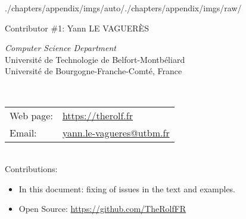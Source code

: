 \begin{graphicspathcontext}{{./chapters/appendix/imgs/auto/}{./chapters/appendix/imgs/raw/}}
\begin{frame}{{Contributor \#1:} Yann LE VAGUER\`ES}
	\begin{minipage}[t]{.75\linewidth}
		\begin{raggedright}
			\textit{Computer Science Department} \\[.5cm]
			{\scriptsize
				Universit\'e de Technologie de Belfort-Montb\'eliard\\
				Universit\'e de Bourgogne-Franche-Comt\'e, France} \\[.25cm]
		\end{raggedright}
	\end{minipage}%
	\hfill%
	 \\[.5cm]%
	\begin{raggedright}
		\scriptsize \begin{tabularx}{\linewidth}{@{}lX@{}}
			Web page: & \url{https://therolf.fr} \\
			Email: & \href{mailto:yann.le-vagueres@utbm.fr}{yann.le-vagueres@utbm.fr} \\
		\end{tabularx} \\[.5cm]
		\scriptsize Contributions:\begin{itemize}\tiny
			\item In this document: fixing of issues in the text and examples.
			\item Open Source: \url{https://github.com/TheRolfFR}
		\end{itemize}
	\end{raggedright}
\end{frame}

%

\end{graphicspathcontext}